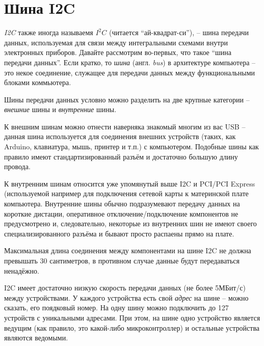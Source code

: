 \documentclass[../sparc.tex]{subfiles}
\begin{document}
\section{Шина I2C}
\label{section:i2c}




\textit{\gls{I2C}} также иногда называемя $I^{2}C$ (читается ``ай-квадрат-си''),
-- шина передачи данных, используемая для связи между интегральными схемами
внутри электронных приборов. Давайте рассмотрим во-первых, что такое ``шина
передачи данных''. Если кратко, то \textit{шина} (англ. \textit{bus}) в
архитектуре компьютера -- это некое соединение, служащее для передачи данных
между функциональными блоками коммьютера.

Шины передачи данных условно можно разделить на две крупные категории --
\textit{внешние} шины и \textit{внутренние} шины.

К внешним шинам можно отнести наверняка знакомый многим из вас \gls{USB} --
данная шина используется для соединения внешних устройств (таких, как Arduino,
клавиатура, мышь, принтер и т.п.) с компьютером.  Подобные шины как правило
имеют стандартизированный разъём и достаточно большую длину провода.

К внутренним шинам относится уже упомянутый выше \gls{I2C} и \gls{PCI}/PCI
Express (используемой например для подключения сетевой карты к материнской плате
компьютера.  Внутренние шины обычно подразумевают передачу данных на короткие
дистации, оперативное отключение/подключение компонентов не предусмотрено и,
следовательно, некоторые из внутренних шин не имеют своего специализированного
разъёма и бывают просто распаены прямо на плате.

Максимальная длина соединения между компонентами на шине \gls{I2C} не должна
превышать 30 сантиметров, в противном случае данные будут передаваться
ненадёжно.

\gls{I2C} имеет достаточно низкую скорость передачи данных (не более 5МБит/с)
между устройствами. У каждого устройства есть свой \textit{адрес} на шине --
можно сказать, его поядковый номер. На одну шину можно подключить до 127
устройств с уникальными адресами. При этом, на шине одно устройство является
ведущим (как правило, это какой-либо микроконтроллер) и остальные устройства
являются ведомыми.
\end{document}
